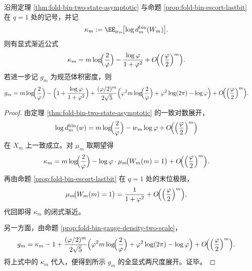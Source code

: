 \begin{theorem}[纤维信息与规范体积密度的全显式两尺度渐近]\label{thm:xi-fold-hidden-logmultiplicity-kappa-gauge-two-scale-explicit}
沿用定理 \ref{thm:fold-bin-two-state-asymptotic} 与命题 \ref{prop:fold-bin-escort-lastbit} 在 \(q=1\) 处的记号，并记
\[
\kappa_m
:=
\EE_{\mu_m}\!\bigl[\log d_m^{\mathrm{bin}}(W_m)\bigr].
\]
则有显式渐近公式
\[
\kappa_m
=
m\log\!\Bigl(\frac{2}{\varphi}\Bigr)
-\frac{\log\varphi}{1+\varphi^2}
+O\!\Bigl(\Bigl(\frac{\varphi}{2}\Bigr)^m\Bigr).
\]
若进一步记 \(g_m\) 为规范体积密度，则
\[
g_m
=
m\log\!\Bigl(\frac{2}{\varphi}\Bigr)
-\Bigl(1+\frac{\log\varphi}{1+\varphi^2}\Bigr)
+\frac{(\varphi/2)^m}{2\sqrt5}
\Bigl(
\varphi^2 m\log\!\Bigl(\frac{2}{\varphi}\Bigr)
+\varphi^2\log(2\pi)-\log\varphi
\Bigr)
+O\!\Bigl(\Bigl(\frac{\varphi}{2}\Bigr)^m\Bigr).
\]
\end{theorem}
\begin{proof}
由定理 \ref{thm:fold-bin-two-state-asymptotic} 的一致对数展开，
\[
\log d_m^{\mathrm{bin}}(w)
=
m\log\!\Bigl(\frac{2}{\varphi}\Bigr)
-w_m\log\varphi
+O\!\Bigl(\Bigl(\frac{\varphi}{2}\Bigr)^m\Bigr)
\]
在 \(X_m\) 上一致成立。对 \(\mu_m\) 取期望得
\[
\kappa_m
=
m\log\!\Bigl(\frac{2}{\varphi}\Bigr)
-\log\varphi\cdot \mu_m\!\bigl(W_m(m)=1\bigr)
+O\!\Bigl(\Bigl(\frac{\varphi}{2}\Bigr)^m\Bigr).
\]
再由命题 \ref{prop:fold-bin-escort-lastbit} 在 \(q=1\) 处的末位极限，
\[
\mu_m\!\bigl(W_m(m)=1\bigr)
=
\frac{1}{1+\varphi^2}
+O\!\Bigl(\Bigl(\frac{\varphi}{2}\Bigr)^m\Bigr),
\]
代回即得 \(\kappa_m\) 的闭式渐近。

另一方面，由命题 \ref{prop:fold-bin-gauge-density-two-scale}，
\[
g_m
=
\kappa_m-1
+\frac{(\varphi/2)^m}{2\sqrt5}
\Bigl(
\varphi^2 m\log\!\Bigl(\frac{2}{\varphi}\Bigr)
+\varphi^2\log(2\pi)-\log\varphi
\Bigr)
+O\!\Bigl(\Bigl(\frac{\varphi}{2}\Bigr)^m\Bigr).
\]
将上式中的 \(\kappa_m\) 代入，便得到所示 \(g_m\) 的全显式两尺度展开。证毕。
\end{proof}

\endinput
